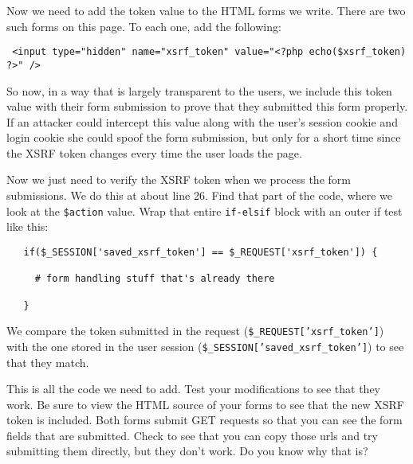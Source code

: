 \documentclass{article}
\begin{document}
Now we need to add the token value to the HTML forms we write.  There are two such forms
on this page.  To each one, add the following:

\begin{verbatim}
 <input type="hidden" name="xsrf_token" value="<?php echo($xsrf_token) ?>" />
\end{verbatim}

So now, in a way that is largely transparent to the users, we include this token value
with their form submission to prove that they submitted this form properly.  If an 
attacker could intercept this value along with the user's session cookie and login cookie
she could spoof the form submission, but only for a short time since the XSRF token changes
every time the user loads the page.

\newpage 

Now we just need to verify the XSRF token when we process the form submissions.  We do this at about 
line 26. Find that part of the code, where we look at the \texttt{\$action} value. Wrap that entire
\texttt{if-elsif} block with an outer if test like this:

\begin{verbatim}
   if($_SESSION['saved_xsrf_token'] == $_REQUEST['xsrf_token']) {

     # form handling stuff that's already there

   }
\end{verbatim}

We compare the token submitted in the request (\texttt{\$\_REQUEST['xsrf\_token']})
with the one stored in the user session  (\texttt{\$\_SESSION['saved\_xsrf\_token']}) to 
see that they match.

This is all the code we need to add.  Test your modifications to see that they work.  Be sure
to view the HTML source of your forms to see that the new XSRF token is included.  Both forms
submit GET requests so that you can see the form fields that are submitted. Check to see that
you can copy those urls and try submitting them directly, but they don't work.  Do you know why 
that is?
\end{document}
